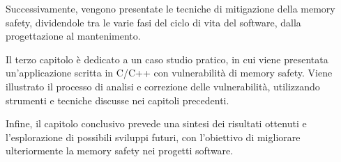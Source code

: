 Successivamente, vengono presentate le tecniche di mitigazione della memory safety,
dividendole tra le varie fasi del ciclo di vita del software, dalla progettazione
al mantenimento.

Il terzo capitolo è dedicato a un caso studio pratico, in cui viene presentata
un'applicazione scritta in C/C++ con vulnerabilità di memory safety. Viene illustrato
il processo di analisi e correzione delle vulnerabilità, utilizzando strumenti e
tecniche discusse nei capitoli precedenti.

Infine, il capitolo conclusivo prevede una sintesi dei risultati ottenuti e l'esplorazione
di possibili sviluppi futuri, con l'obiettivo di migliorare ulteriormente la
memory safety nei progetti software.